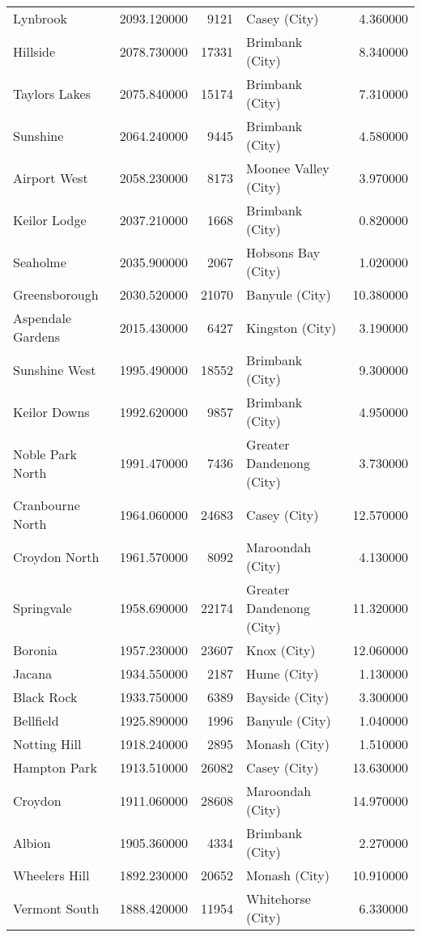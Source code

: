 \begin{longtable}{lrrlr}
Lynbrook & 2093.120000 & 9121 & Casey (City) & 4.360000 \\
Hillside & 2078.730000 & 17331 & Brimbank (City) & 8.340000 \\
Taylors Lakes & 2075.840000 & 15174 & Brimbank (City) & 7.310000 \\
Sunshine & 2064.240000 & 9445 & Brimbank (City) & 4.580000 \\
Airport West & 2058.230000 & 8173 & Moonee Valley (City) & 3.970000 \\
Keilor Lodge & 2037.210000 & 1668 & Brimbank (City) & 0.820000 \\
Seaholme & 2035.900000 & 2067 & Hobsons Bay (City) & 1.020000 \\
Greensborough & 2030.520000 & 21070 & Banyule (City) & 10.380000 \\
Aspendale Gardens & 2015.430000 & 6427 & Kingston (City) & 3.190000 \\
Sunshine West & 1995.490000 & 18552 & Brimbank (City) & 9.300000 \\
Keilor Downs & 1992.620000 & 9857 & Brimbank (City) & 4.950000 \\
Noble Park North & 1991.470000 & 7436 & Greater Dandenong (City) & 3.730000 \\
Cranbourne North & 1964.060000 & 24683 & Casey (City) & 12.570000 \\
Croydon North & 1961.570000 & 8092 & Maroondah (City) & 4.130000 \\
Springvale & 1958.690000 & 22174 & Greater Dandenong (City) & 11.320000 \\
Boronia & 1957.230000 & 23607 & Knox (City) & 12.060000 \\
Jacana & 1934.550000 & 2187 & Hume (City) & 1.130000 \\
Black Rock & 1933.750000 & 6389 & Bayside (City) & 3.300000 \\
Bellfield & 1925.890000 & 1996 & Banyule (City) & 1.040000 \\
Notting Hill & 1918.240000 & 2895 & Monash (City) & 1.510000 \\
Hampton Park & 1913.510000 & 26082 & Casey (City) & 13.630000 \\
Croydon & 1911.060000 & 28608 & Maroondah (City) & 14.970000 \\
Albion & 1905.360000 & 4334 & Brimbank (City) & 2.270000 \\
Wheelers Hill & 1892.230000 & 20652 & Monash (City) & 10.910000 \\
Vermont South & 1888.420000 & 11954 & Whitehorse (City) & 6.330000 \\

\end{longtable}
